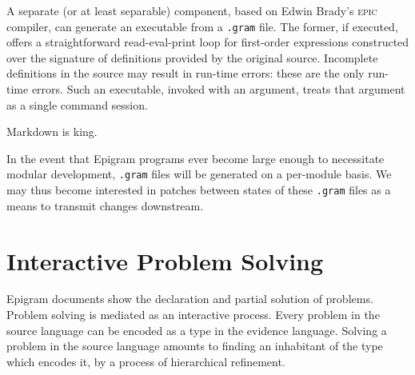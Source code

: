 \documentclass{article}
\begin{document}
A separate (or at least separable) component, based on Edwin Brady's
\textsc{epic} compiler, can generate an executable from a \texttt{.gram}
file. The former, if executed, offers a straightforward
read-eval-print loop for first-order expressions constructed over the
signature of definitions provided by the original source. Incomplete
definitions in the source may result in run-time errors: these are the
only run-time errors.  Such an executable, invoked with an argument,
treats that argument as a single command session.

Markdown is king.

In the event that Epigram programs ever become large enough to
necessitate modular development, \texttt{.gram} files will be generated
on a per-module basis. We may thus become interested in patches
between states of these \texttt{.gram} files as a means to transmit
changes downstream.


\section{Interactive Problem Solving}

Epigram documents show the declaration and partial solution of problems.
Problem solving is mediated as an interactive process. Every problem
in the source language can be encoded as a type in the evidence
language. Solving a problem in the source language amounts to finding
an inhabitant of the type which encodes it, by a process of
hierarchical refinement.
\end{document}
